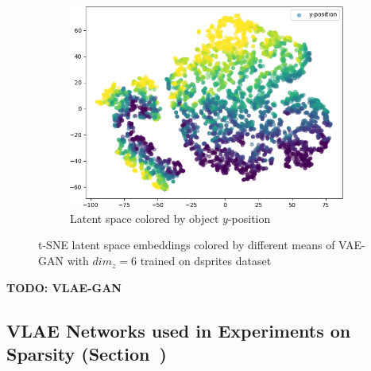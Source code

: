 \documentclass[11pt]{article}
\let\oldsection\section
\renewcommand\section{\clearpage\oldsection}
\begin{document}
\begin{figure}[H]
\begin{subfigure}{.19\textwidth}
\includegraphics[width=\textwidth]{images/latent_spaces/dsprites/vae_gan/embeddings_mu_4.png}
\caption{Latent space colored by object $y$-position}
\end{subfigure}
\caption{t-SNE latent space embeddings colored by different means of \ac{VAE}-\ac{GAN} with $dim_z=6$ trained on dsprites dataset}
\label{fig:vae_gan_latent_space_dsprites}
\end{figure}

\textbf{TODO: VLAE-GAN}


\pagebreak
\begin{landscape}
\section{\ac{VLAE} Networks used in Experiments on Sparsity (Section~\label{subsec:effective-network-capacity})}\label{sec:listings_sparsity_networks}

\pagebreak

\pagebreak

\pagebreak

\pagebreak

\pagebreak

\end{landscape}

\pagebreak
\end{document}

